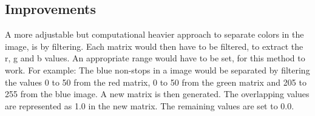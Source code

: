 \subsection{Improvements}
A more adjustable but computational heavier approach to separate colors in the image, is by filtering. Each matrix would then have to be filtered, to extract the r, g and b values. An appropriate range would have to be set, for this method to work. For example: The blue non-stops in a image would be separated by filtering the values 0 to 50 from the red matrix, 0 to 50 from the green matrix and 205 to 255 from the blue image. A new matrix is then generated. The overlapping values are represented as 1.0 in the new matrix. The remaining values are set to 0.0. \\



